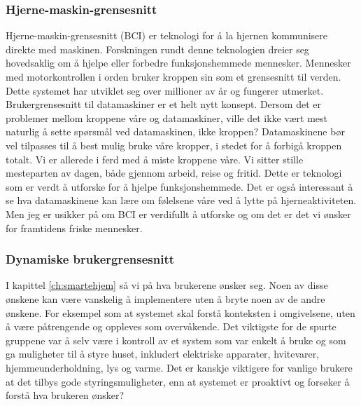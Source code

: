 \subsubsection*{Hjerne-maskin-grensesnitt}
Hjerne-maskin-grensesnitt (BCI) er teknologi for å la hjernen kommunisere direkte med maskinen. Forskningen rundt denne teknologien dreier seg hovedsaklig om å hjelpe eller forbedre funksjonshemmede mennesker. Mennesker med motorkontrollen i orden bruker kroppen sin som et grensesnitt til verden. Dette systemet har utviklet seg over millioner av år og fungerer utmerket. Brukergrensesnitt til datamaskiner er et helt nytt konsept. Dersom det er problemer mellom kroppene våre og datamaskiner, ville det ikke vært mest naturlig å sette spørsmål ved datamaskinen, ikke kroppen? Datamaskinene bør vel tilpasses til å best mulig bruke våre kropper, i stedet for å forbigå kroppen totalt. Vi er allerede i ferd med å miste kroppene våre. Vi sitter stille mesteparten av dagen, både gjennom arbeid, reise og fritid. Dette er teknologi som er verdt å utforske for å hjelpe funksjonshemmede. Det er også interessant å se hva datamaskinene kan lære om følelsene våre ved å lytte på hjerneaktiviteten. Men jeg er usikker på om BCI er verdifullt å utforske og om det er det vi ønsker for framtidens friske mennesker.

\subsubsection*{Dynamiske brukergrensesnitt}
I kapittel \ref{ch:smartehjem} så vi på hva brukerene ønsker seg. Noen av disse ønskene kan være vanskelig å implementere uten å bryte noen av de andre ønskene. For eksempel som at systemet skal forstå konteksten i omgivelsene, uten å være påtrengende og oppleves som overvåkende. Det viktigste for de spurte gruppene var å selv være i kontroll av et system som var enkelt å bruke og som ga muligheter til å styre huset, inkludert elektriske apparater, hvitevarer, hjemmeunderholdning, lys og varme. Det er kanskje viktigere for vanlige brukere at det tilbys gode styringsmuligheter, enn at systemet er proaktivt og forsøker å forstå hva brukeren ønsker?

